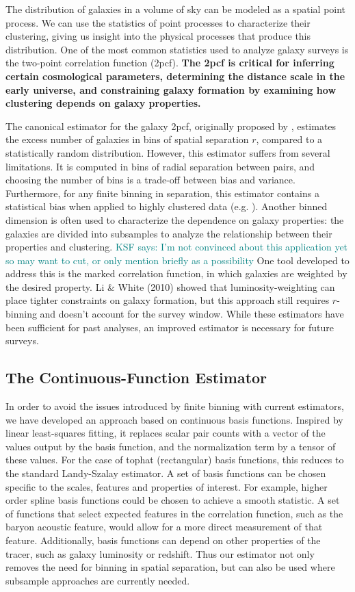 \documentclass[12pt, fullpage, letterpaper]{article}
\newcommand{\KSF}[1]{\textcolor{teal}{KSF says: #1}}
\newcommand{\cf}{2pcf\xspace}
\begin{document}
The distribution of galaxies in a volume of sky can be modeled as a spatial point process.
We can use the statistics of point processes to characterize their clustering, giving us insight into the physical processes that produce this distribution.
One of the most common statistics used to analyze galaxy surveys is the two-point correlation function (\cf). 
\textbf{The \cf is critical for inferring certain cosmological parameters, determining the distance scale in the early universe, and constraining galaxy formation by examining how clustering depends on galaxy properties.}
 
The canonical estimator for the galaxy \cf, originally proposed by \citep{LandySzalay1993}, estimates the excess number of galaxies in bins of spatial separation $r$, compared to a statistically random distribution.
However, this estimator suffers from several limitations. 
It is computed in bins of radial separation between pairs, and choosing the number of bins is a trade-off between bias and variance.
Furthermore, for any finite binning in separation, this estimator contains a statistical bias when applied to highly clustered data (e.g. \citealt{Kerscher1998}).
Another binned dimension is often used to characterize the dependence on galaxy properties: the galaxies are divided into subsamples to analyze the relationship between their properties and clustering. 
\KSF{I'm not convinced about this application yet so may want to cut, or only mention briefly as a possibility}
One tool developed to address this is the marked correlation function, in which galaxies are weighted by the desired property.
Li \& White (2010) showed that luminosity-weighting can place tighter constraints on galaxy formation, but this approach still requires $r$-binning and doesn't account for the survey window.
While these estimators have been sufficient for past analyses, an improved estimator is necessary for future surveys.

\subsection{The Continuous-Function Estimator}

In order to avoid the issues introduced by finite binning with current estimators, we have developed an approach based on continuous basis functions. 
Inspired by linear least-squares fitting, it replaces scalar pair counts with a vector of the values output by the basis function, and the normalization term by a tensor of these values.
For the case of tophat (rectangular) basis functions, this reduces to the standard Landy-Szalay estimator.
A set of basis functions can be chosen specific to the scales, features and properties of interest.
For example, higher order spline basis functions could be chosen to achieve a smooth statistic. 
A set of functions that select expected features in the correlation function, such as the baryon acoustic feature, would allow for a more direct measurement of that feature.
Additionally, basis functions can depend on other properties of the tracer, such as galaxy luminosity or redshift.
Thus our estimator not only removes the need for binning in spatial separation, but can also be used where subsample approaches are currently needed.
\end{document}
